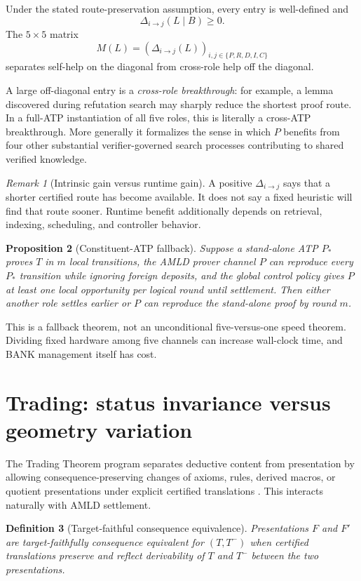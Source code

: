 \documentclass[11pt]{article}
\newtheorem{definition}{Definition}[section]
\newtheorem{proposition}[definition]{Proposition}
\theoremstyle{remark}
\newtheorem{remark}[definition]{Remark}
\begin{document}
Under the stated route-preservation assumption, every entry is well-defined and
\[
\Delta_{i\to j}(L\mid B)\ge0.
\]
The $5\times5$ matrix
\[
M(L)=(\Delta_{i\to j}(L))_{i,j\in\{P,R,D,I,C\}}
\]
separates self-help on the diagonal from cross-role help off the diagonal.

A large off-diagonal entry is a \emph{cross-role breakthrough}: for example, a lemma discovered during refutation search may sharply reduce the shortest proof route. In a full-ATP instantiation of all five roles, this is literally a cross-ATP breakthrough. More generally it formalizes the sense in which $P$ benefits from four other substantial verifier-governed search processes contributing to shared verified knowledge.

\begin{remark}[Intrinsic gain versus runtime gain]
A positive $\Delta_{i\to j}$ says that a shorter certified route has become available. It does not say a fixed heuristic will find that route sooner. Runtime benefit additionally depends on retrieval, indexing, scheduling, and controller behavior.
\end{remark}

\begin{proposition}[Constituent-ATP fallback]
Suppose a stand-alone ATP $P_*$ proves $T$ in $m$ local transitions, the AMLD prover channel $P$ can reproduce every $P_*$ transition while ignoring foreign deposits, and the global control policy gives $P$ at least one local opportunity per logical round until settlement. Then either another role settles earlier or $P$ can reproduce the stand-alone proof by round $m$.
\end{proposition}

This is a fallback theorem, not an unconditional five-versus-one speed theorem. Dividing fixed hardware among five channels can increase wall-clock time, and BANK management itself has cost.

\section{Trading: status invariance versus geometry variation}

The Trading Theorem program separates deductive content from presentation by allowing consequence-preserving changes of axioms, rules, derived macros, or quotient presentations under explicit certified translations \cite{trading}. This interacts naturally with AMLD settlement.

\begin{definition}[Target-faithful consequence equivalence]
Presentations $F$ and $F'$ are target-faithfully consequence equivalent for $(T,T^-)$ when certified translations preserve and reflect derivability of $T$ and $T^-$ between the two presentations.
\end{definition}
\end{document}

